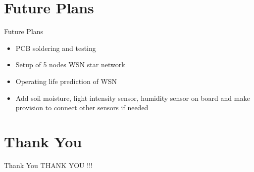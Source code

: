 \documentclass[10pt, a4paper]{beamer}
\begin{document}
\section{Future Plans}
\begin{frame}{Future Plans}
	\begin{itemize}
		\item PCB soldering and testing
        \item Setup of 5 nodes WSN star network
        \item Operating life prediction of WSN
        \item Add soil moisture, light intensity sensor, humidity sensor on board and make provision to connect other sensors if needed
	\end{itemize}
\end{frame}


\section{Thank You}
\begin{frame}{Thank You}
	\centering THANK YOU !!!
\end{frame}
\end{document}
